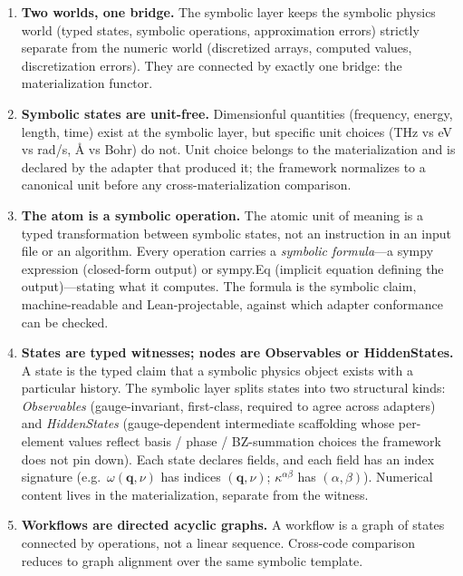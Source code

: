 \documentclass[11pt,a4paper]{article}
\begin{document}
\begin{enumerate}[leftmargin=2.5em, itemsep=0.4em]
  \item \textbf{Two worlds, one bridge.} The symbolic layer keeps the symbolic physics world
        (typed states, symbolic operations, approximation errors) strictly separate from
        the numeric world (discretized arrays, computed values, discretization errors).
        They are connected by exactly one bridge: the materialization functor.

  \item \textbf{Symbolic states are unit-free.} Dimensionful quantities (frequency,
        energy, length, time) exist at the symbolic layer, but specific unit choices
        (THz vs eV vs rad/s, \AA{} vs Bohr) do not. Unit choice belongs to the
        materialization and is declared by the adapter that produced it; the framework
        normalizes to a canonical unit before any cross-materialization comparison.

  \item \textbf{The atom is a symbolic operation.} The atomic unit of meaning is a typed
        transformation between symbolic states, not an instruction in an input file or an
        algorithm. Every operation carries a \emph{symbolic formula}---a sympy expression
        (closed-form output) or sympy.Eq (implicit equation defining the output)---stating
        what it computes. The formula is the symbolic claim, machine-readable and
        Lean-projectable, against which adapter conformance can be checked.

  \item \textbf{States are typed witnesses; nodes are Observables or HiddenStates.}
        A state is the typed claim that a symbolic physics object exists with a
        particular history. The symbolic layer splits states into two structural kinds:
        \emph{Observables} (gauge-invariant, first-class, required to agree across
        adapters) and \emph{HiddenStates} (gauge-dependent intermediate scaffolding
        whose per-element values reflect basis / phase / BZ-summation choices the
        framework does not pin down). Each state declares fields, and each field has an
        index signature (e.g.\ $\omega(\mathbf{q},\nu)$ has indices $(\mathbf{q}, \nu)$;
        $\kappa^{\alpha\beta}$ has $(\alpha, \beta)$). Numerical content lives in the
        materialization, separate from the witness.

  \item \textbf{Workflows are directed acyclic graphs.} A workflow is a graph of states
        connected by operations, not a linear sequence. Cross-code comparison reduces
        to graph alignment over the same symbolic template.


\end{enumerate}
\end{document}

